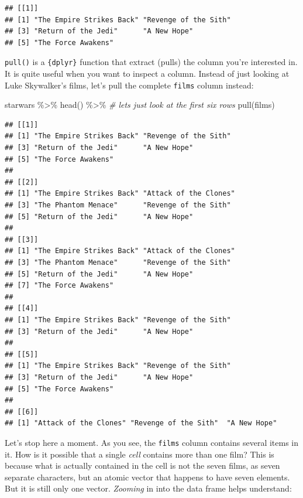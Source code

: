 \documentclass[
]{article}
\newenvironment{Shaded}{\begin{snugshade}}{\end{snugshade}}
\newcommand{\CommentTok}[1]{\textcolor[rgb]{0.56,0.35,0.01}{\textit{#1}}}
\newcommand{\FunctionTok}[1]{\textcolor[rgb]{0.00,0.00,0.00}{#1}}
\newcommand{\NormalTok}[1]{#1}
\newcommand{\SpecialCharTok}[1]{\textcolor[rgb]{0.00,0.00,0.00}{#1}}
\begin{document}
\begin{verbatim}
## [[1]]
## [1] "The Empire Strikes Back" "Revenge of the Sith"    
## [3] "Return of the Jedi"      "A New Hope"             
## [5] "The Force Awakens"
\end{verbatim}

\texttt{pull()} is a \texttt{\{dplyr\}} function that extract (pulls) the column you're interested in. It is quite
useful when you want to inspect a column. Instead of just looking at Luke Skywalker's films,
let's pull the complete \texttt{films} column instead:

\begin{Shaded}
\begin{Highlighting}[]
\NormalTok{starwars }\SpecialCharTok{\%\textgreater{}\%}
  \FunctionTok{head}\NormalTok{() }\SpecialCharTok{\%\textgreater{}\%}  \CommentTok{\# let\textquotesingle{}s just look at the first six rows}
  \FunctionTok{pull}\NormalTok{(films) }
\end{Highlighting}
\end{Shaded}

\begin{verbatim}
## [[1]]
## [1] "The Empire Strikes Back" "Revenge of the Sith"    
## [3] "Return of the Jedi"      "A New Hope"             
## [5] "The Force Awakens"      
## 
## [[2]]
## [1] "The Empire Strikes Back" "Attack of the Clones"   
## [3] "The Phantom Menace"      "Revenge of the Sith"    
## [5] "Return of the Jedi"      "A New Hope"             
## 
## [[3]]
## [1] "The Empire Strikes Back" "Attack of the Clones"   
## [3] "The Phantom Menace"      "Revenge of the Sith"    
## [5] "Return of the Jedi"      "A New Hope"             
## [7] "The Force Awakens"      
## 
## [[4]]
## [1] "The Empire Strikes Back" "Revenge of the Sith"    
## [3] "Return of the Jedi"      "A New Hope"             
## 
## [[5]]
## [1] "The Empire Strikes Back" "Revenge of the Sith"    
## [3] "Return of the Jedi"      "A New Hope"             
## [5] "The Force Awakens"      
## 
## [[6]]
## [1] "Attack of the Clones" "Revenge of the Sith"  "A New Hope"
\end{verbatim}

Let's stop here a moment. As you see, the \texttt{films} column contains several items in it. How is it
possible that a single \emph{cell} contains more than one film? This is because what is actually
contained in the cell is not the seven films, as seven separate characters, but an atomic vector
that happens to have seven elements. But it is still only one vector. \emph{Zooming} in into the data
frame helps understand:
\end{document}
